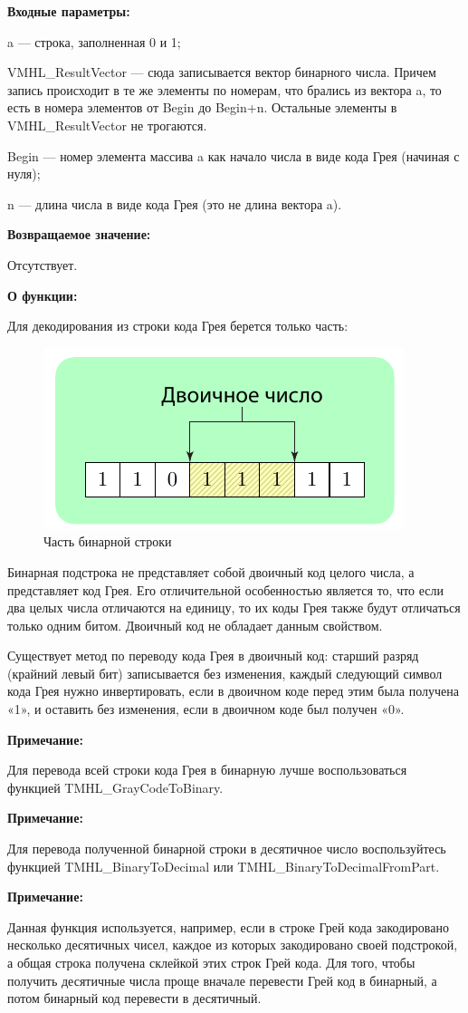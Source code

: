 \textbf{Входные параметры:}
 
 a --- строка, заполненная 0 и 1;
 
 VMHL\_ResultVector --- сюда записывается вектор бинарного числа. Причем запись происходит в те же элементы по номерам, что брались из вектора a, то есть в номера элементов от Begin до Begin+n. Остальные элементы в VMHL\_ResultVector не трогаются.
 
 Begin --- номер элемента массива a как начало числа в виде кода Грея (начиная с нуля);
 
 n --- длина числа в виде кода Грея (это не длина вектора a).
 
\textbf{Возвращаемое значение:}

 Отсутствует.
 
\textbf{О функции:}

Для декодирования из строки кода Грея берется только часть:

\begin{figure} [h]
  \center
  \includegraphics [scale=1] {TMHL_BinaryToDecimalFromPart_Sheme}
  \caption{Часть бинарной строки} 
  \label{img:TMHL_BinaryToDecimalFromPart_Sheme}  
\end{figure}

Бинарная подстрока не представляет собой двоичный код целого числа, а представляет код Грея. Его отличительной особенностью является то, что если два целых числа отличаются на единицу, то их коды Грея также будут отличаться только одним битом. Двоичный код не обладает данным свойством.

Существует метод по переводу кода Грея в двоичный код: старший разряд (крайний левый бит) записывается без изменения, каждый следующий символ кода Грея нужно инвертировать, если в двоичном коде перед этим была получена «1», и оставить без изменения, если в двоичном коде был получен «0».
 
 \textbf{Примечание:}
 
 Для перевода всей строки кода Грея в бинарную лучше воспользоваться функцией TMHL\_GrayCodeToBinary.

 \textbf{Примечание:}

 Для перевода полученной бинарной строки в десятичное число воспользуйтесь функцией TMHL\_BinaryToDecimal или TMHL\_BinaryToDecimalFromPart.

 \textbf{Примечание:}
 
 Данная функция используется, например, если в строке Грей кода закодировано несколько десятичных чисел, каждое из которых закодировано своей подстрокой, а общая строка получена склейкой этих строк Грей кода. Для того, чтобы получить десятичные числа проще вначале перевести Грей код в бинарный, а потом бинарный код перевести в десятичный.